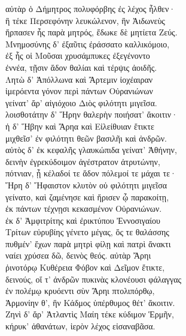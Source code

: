 \begin{pages}
\begin{Leftside}
\quad{}αὐτὰρ ὁ Δήμητρος πολυφόρβης ἐς λέχος ἦλθεν· \\
ἣ τέκε Περσεφόνην λευκώλενον, ἣν Ἀιδωνεὺς\\
ἥρπασεν ἧς παρὰ μητρός, ἔδωκε δὲ μητίετα Ζεύς. \\

\quad{}Μνημοσύνης δ' ἐξαῦτις ἐράσσατο καλλικόμοιο,  \\
ἐξ ἧς οἱ Μοῦσαι χρυσάμπυκες ἐξεγένοντο\\
ἐννέα, τῇσιν ἅδον θαλίαι καὶ τέρψις ἀοιδῆς.\\

\quad{}Λητὼ δ' Ἀπόλλωνα καὶ Ἄρτεμιν ἰοχέαιραν \\
ἱμερόεντα γόνον περὶ πάντων Οὐρανιώνων\\
γείνατ' ἄρ' αἰγιόχοιο Διὸς φιλότητι μιγεῖσα. \\

\quad{}λοισθοτάτην δ' Ἥρην θαλερὴν ποιήσατ' ἄκοιτιν· \\
ἡ δ' Ἥβην καὶ Ἄρηα καὶ Εἰλείθυιαν ἔτικτε \\
μιχθεῖσ' ἐν φιλότητι θεῶν βασιλῆι καὶ ἀνδρῶν. \\

\quad{}αὐτὸς δ' ἐκ κεφαλῆς γλαυκώπιδα γείνατ' Ἀθήνην, \\
δεινὴν ἐγρεκύδοιμον ἀγέστρατον ἀτρυτώνην,  \\
πότνιαν, ᾗ κέλαδοί τε ἅδον πόλεμοί τε μάχαι τε· \\
Ἥρη δ' Ἥφαιστον κλυτὸν οὐ φιλότητι μιγεῖσα\\
γείνατο, καὶ ζαμένησε καὶ ἤρισεν ᾧ παρακοίτῃ,\\
ἐκ πάντων τέχνῃσι κεκασμένον Οὐρανιώνων.\\

\quad{}ἐκ δ' Ἀμφιτρίτης καὶ ἐρικτύπου Ἐννοσιγαίου \\
Τρίτων εὐρυβίης γένετο μέγας, ὅς τε θαλάσσης \\
πυθμέν' ἔχων παρὰ μητρὶ φίλῃ καὶ πατρὶ ἄνακτι\\
ναίει χρύσεα δῶ, δεινὸς θεός. αὐτὰρ Ἄρηι\\
ῥινοτόρῳ Κυθέρεια Φόβον καὶ Δεῖμον ἔτικτε, \\
δεινούς, οἵ τ' ἀνδρῶν πυκινὰς κλονέουσι φάλαγγας \\
ἐν πολέμῳ κρυόεντι σὺν Ἄρηι πτολιπόρθῳ,\\
Ἁρμονίην θ', ἣν Κάδμος ὑπέρθυμος θέτ' ἄκοιτιν. \\

\quad{}Ζηνὶ δ' ἄρ' Ἀτλαντὶς Μαίη τέκε κύδιμον Ἑρμῆν,\\
κήρυκ' ἀθανάτων, ἱερὸν λέχος εἰσαναβᾶσα.\\


\end{Leftside}
\end{pages}
